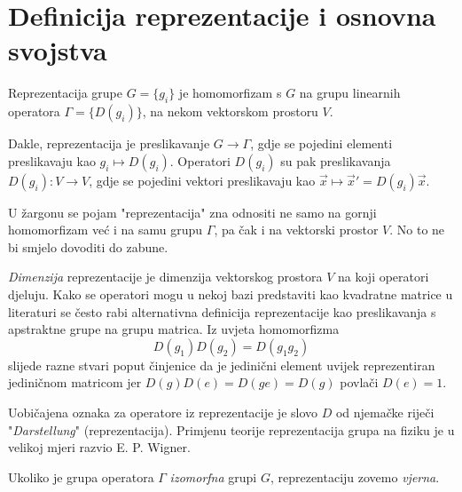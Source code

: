 \section{Definicija reprezentacije i osnovna svojstva}
\label{sec:reprezentacije}

\begin{definicija} 
Reprezentacija grupe $G=\{g_{i}\}$ je homomorfizam s $G$ na
grupu linearnih operatora
$\Gamma=\{D(g_{i})\}$, na nekom vektorskom prostoru $V$.
\end{definicija}

Dakle, reprezentacija je preslikavanje $G \to \Gamma$, gdje
se pojedini elementi preslikavaju kao $g_{i} \mapsto D(g_i)$.
Operatori $D(g_i)$ su pak preslikavanja $D(g_i):V \to V$, gdje
se pojedini vektori preslikavaju kao $\vec{x} \mapsto \vec{x}' = D(g_i) \vec{x}$.

U žargonu se pojam "reprezentacija" zna odnositi ne samo na
gornji homomorfizam već i na samu grupu $\Gamma$, pa čak i na vektorski
prostor $V$. No to ne bi smjelo dovoditi do zabune.

\emph{Dimenzija} reprezentacije je dimenzija vektorskog prostora $V$ na koji operatori djeluju.
Kako se  operatori mogu u nekoj bazi predstaviti kao kvadratne matrice u literaturi
 se često rabi alternativna definicija reprezentacije kao preslikavanja s
 apstraktne grupe na grupu matrica.
Iz uvjeta homomorfizma
\begin{displaymath}
           D(g_1) D(g_2) = D(g_1 g_2)
\end{displaymath}
slijede razne stvari poput činjenice da je jedinični element uvijek reprezentiran
jediničnom matricom jer $D(g)D(e)=D(ge)=D(g)$ povlači $D(e)=1$.

Uobičajena oznaka za operatore iz reprezentacije je slovo $D$ od
njemačke riječi "\emph{Darstellung}" (reprezentacija). Primjenu teorije reprezentacija
  grupa na fiziku je u velikoj mjeri razvio E. P. Wigner.

Ukoliko je grupa operatora $\Gamma$ \emph{izomorfna} grupi $G$, 
  reprezentaciju zovemo \emph{vjerna}.


